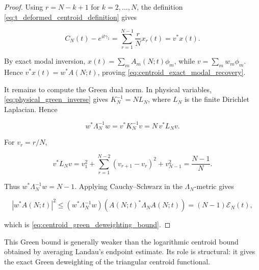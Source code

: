 \documentclass[11pt]{amsart}
\numberwithin{equation}{section}
\theoremstyle{plain}
\theoremstyle{definition}
\theoremstyle{remark}
\begin{document}
\begin{proof}
Using \(r=N-k+1\) for \(k=2,\ldots,N\), the definition
\eqref{eq:t_deformed_centroid_definition} gives

\begin{equation}
C_N(t)-e^{it\gamma_1}
=
\sum_{r=1}^{N-1}\frac rN x_r(t)
=
v^*x(t).
\label{eq:centroid_reversed_linear_functional}
\end{equation}

By exact modal inversion, \(x(t)=\sum_m A_m(N;t)\phi_m\), while
\(v=\sum_m w_m\phi_m\). Hence \(v^*x(t)=w^*A(N;t)\), proving
\eqref{eq:centroid_exact_modal_recovery}.

It remains to compute the Green dual norm. In physical variables,
\eqref{eq:physical_green_inverse} gives \(K_N^{-1}=NL_N\), where \(L_N\)
is the finite Dirichlet Laplacian. Hence

\begin{equation}
w^*\Lambda_N^{-1}w
=
v^*K_N^{-1}v
=
N\,v^*L_Nv.
\label{eq:centroid_green_dual_norm_physical}
\end{equation}

For \(v_r=r/N\),

\begin{equation}
v^*L_Nv
=
v_1^2
+
\sum_{r=1}^{N-2}(v_{r+1}-v_r)^2
+
v_{N-1}^2
=
\frac{N-1}{N}.
\label{eq:centroid_laplacian_quadratic_form}
\end{equation}

Thus \(w^*\Lambda_N^{-1}w=N-1\). Applying Cauchy--Schwarz in the
\(\Lambda_N\)-metric gives

\begin{equation}
|w^*A(N;t)|^2
\le
(w^*\Lambda_N^{-1}w)
(A(N;t)^*\Lambda_NA(N;t))
=
(N-1)\mathcal E_N(t),
\label{eq:centroid_deweighting_cauchy}
\end{equation}

which is \eqref{eq:centroid_green_deweighting_bound}.
\end{proof}

This Green bound is generally weaker than the logarithmic centroid bound
obtained by averaging Landau's endpoint estimate. Its role is structural:
it gives the exact Green deweighting of the triangular centroid
functional.
\end{document}
